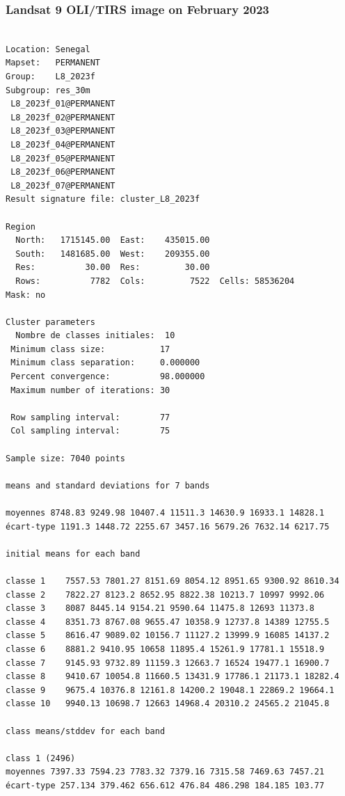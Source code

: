 \documentclass[land,article,submit,pdftex,moreauthors]{Definitions/mdpi}
\begin{document}
\subsubsection[\appendixname~\thesubsubsection]{Landsat 9 OLI/TIRS image on February 2023}
\begin{scriptsize}
\begin{verbatim}

Location: Senegal
Mapset:   PERMANENT
Group:    L8_2023f
Subgroup: res_30m
 L8_2023f_01@PERMANENT
 L8_2023f_02@PERMANENT
 L8_2023f_03@PERMANENT
 L8_2023f_04@PERMANENT
 L8_2023f_05@PERMANENT
 L8_2023f_06@PERMANENT
 L8_2023f_07@PERMANENT
Result signature file: cluster_L8_2023f

Region
  North:   1715145.00  East:    435015.00
  South:   1481685.00  West:    209355.00
  Res:          30.00  Res:         30.00
  Rows:          7782  Cols:         7522  Cells: 58536204
Mask: no

Cluster parameters
  Nombre de classes initiales: 	10
 Minimum class size:           17
 Minimum class separation:     0.000000
 Percent convergence:          98.000000
 Maximum number of iterations: 30

 Row sampling interval:        77
 Col sampling interval:        75

Sample size: 7040 points

means and standard deviations for 7 bands

moyennes 8748.83 9249.98 10407.4 11511.3 14630.9 16933.1 14828.1
écart-type 1191.3 1448.72 2255.67 3457.16 5679.26 7632.14 6217.75

initial means for each band

classe 1    7557.53 7801.27 8151.69 8054.12 8951.65 9300.92 8610.34
classe 2    7822.27 8123.2 8652.95 8822.38 10213.7 10997 9992.06
classe 3    8087 8445.14 9154.21 9590.64 11475.8 12693 11373.8
classe 4    8351.73 8767.08 9655.47 10358.9 12737.8 14389 12755.5
classe 5    8616.47 9089.02 10156.7 11127.2 13999.9 16085 14137.2
classe 6    8881.2 9410.95 10658 11895.4 15261.9 17781.1 15518.9
classe 7    9145.93 9732.89 11159.3 12663.7 16524 19477.1 16900.7
classe 8    9410.67 10054.8 11660.5 13431.9 17786.1 21173.1 18282.4
classe 9    9675.4 10376.8 12161.8 14200.2 19048.1 22869.2 19664.1
classe 10   9940.13 10698.7 12663 14968.4 20310.2 24565.2 21045.8

class means/stddev for each band

class 1 (2496)
moyennes 7397.33 7594.23 7783.32 7379.16 7315.58 7469.63 7457.21
écart-type 257.134 379.462 656.612 476.84 486.298 184.185 103.77


\end{verbatim}
\end{scriptsize}
\end{document}
